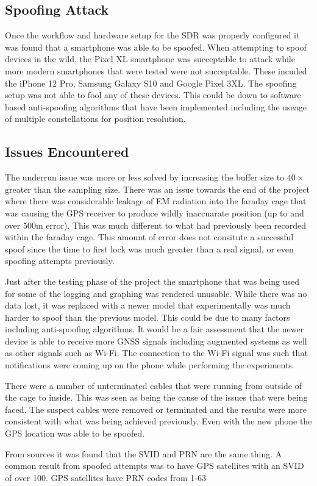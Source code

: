 \subsection{Spoofing Attack}
Once the workflow and hardware setup for the SDR was properly configured it was found that a smartphone was able to be spoofed.
When attempting to spoof devices in the wild, the Pixel XL smartphone was succeptable to attack while more modern smartphones that were tested were not succeptable. These
incuded the iPhone 12 Pro, Samsung Galaxy S10 and Google Pixel 3XL. The spoofing setup was not able to fool any of these devices. This could be down to software based
anti-spoofing algorithms that have been implemented including the useage of multiple constellations for position resolution.

\subsection{Issues Encountered}
The underrun issue was more or less solved by increasing the buffer size to $40\times$ greater than the sampling size.
There was an issue towards the end of the project where there was considerable leakage of EM radiation into the faraday cage that was causing the GPS receiver to produce
wildly inaccuarate position (up to and over 500m error). This was much different to what had previously been recorded within the faraday cage. This amount of error does
not consitute a successful spoof since the time to first lock was much greater than a real signal, or even spoofing attempts previously. 

Just after the testing phase of the project the smartphone that was being used for some of the logging and graphing was rendered unusable. While there was no data lost,
it was replaced with a newer model that experimentally was much harder to spoof than the previous model. This could be due to many factors including anti-spoofing
algorithms. It would be a fair assessment that the newer device is able to receive more GNSS signals including augmented systems as well as other signals such as Wi-Fi.
The connection to the Wi-Fi signal was such that notifications were coming up on the phone while performing the experiments.

There were a number of unterminated cables that were running from outside of the cage to inside. This was seen as being the cause of the issues that were being faced. The
suspect cables were removed or terminated and the results were more consistent with what was being achieved previously. Even with the new phone the GPS location was able
to be spoofed.

From sources  it was found that the SVID and PRN are the same thing. 
A common result from spoofed attempts was to have GPS satellites with an SVID of over 100. GPS satellites have PRN codes from 1-63